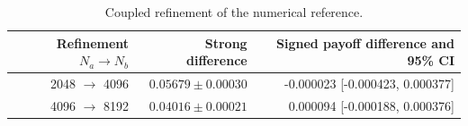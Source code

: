 \begin{table}[H]\centering\small
\caption{Coupled refinement of the numerical reference.}
\label{tab:nonaffine-reference}
\begin{tabular}{rrr}\toprule
Refinement $N_a\to N_b$ & Strong difference & Signed payoff difference and 95\% CI\\\midrule
2048 $\to$ 4096 & $0.05679\pm0.00030$ & -0.000023 [-0.000423, 0.000377]\\
4096 $\to$ 8192 & $0.04016\pm0.00021$ & 0.000094 [-0.000188, 0.000376]\\
\bottomrule\end{tabular}
\end{table}

